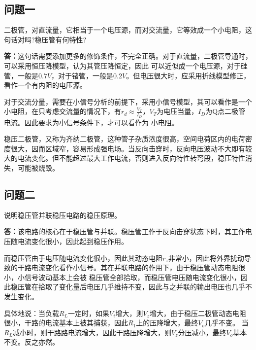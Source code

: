 \documentclass[a4paper,11pt,UTF8]{ctexart}
\begin{document}
\subsection{问题一}
二极管，对直流量，它相当于一个电压源，而对交流量，它等效成一个小电阻，这句话对吗?稳压管有何特性?

\textbf{答：}这句话需要添加更多的修饰条件，不完全正确。对于直流量，二极管导通时，可以采用恒压降模型，认为其管压降恒定，因此
可以近似成一个电压源，对于硅管，一般是$0.7V$，对于锗管，一般是$0.2V$。但电压很大时，应采用折线模型修正，看作一个有内阻的电压源。

对于交流分量，需要在小信号分析的前提下，采用小信号模型，其可以看作是一个小电阻，在只考虑交流量的情况下，有$r_d\approx\frac{V_T}{I_D}$，$V_T$为电压当量，$I_D$为Q点二极管电流。因此要求为小信号条件下，才可以看作为
小电阻。

稳压二极管，又称为齐纳二极管，这种管子杂质浓度很高，空间电荷区内的电荷密度很大，因而区域窄，容易形成强电场。当反向击穿时，反向电压波动不大即有较大的电流变化。但不能超过最大工作电流，否则进入反向特性转弯段，稳压特性消失，可能被烧毁。
\subsection{问题二}
说明稳压管并联稳压电路的稳压原理。

\textbf{答：}该电路的核心在于稳压管与并联。稳压管工作于反向击穿状态下时，其工作电压随电流变化很小，因此起到稳压作用。

而稳压管由于电压随电流变化很小，因此其动态电阻$r_z$非常小，因此将外界扰动导致的干路电流变化看作小信号。其在并联电路的作用下，由于稳压管动态电阻很小，小信号波动基本上会被
稳压管全部拾取，而稳压管电压随电流变化很小，因此稳压管在拾取了变化量后电压几乎维持不变，因此与之并联的输出电压也几乎不发生变化。

具体地说：当负载$R_L$一定时，如果$V_i$增大，则$V_z$增大，由于稳压二极管动态电阻很小，干路的电流基本上被其捕获，因此$R_1$上的压降增大，最终$V_o$几乎不变。
当$R_L$减小时，则干路路电流增大，因此干路压降增大，则$V_z$分压减小，最终$V_o$基本不变。反之亦然。
\end{document}
